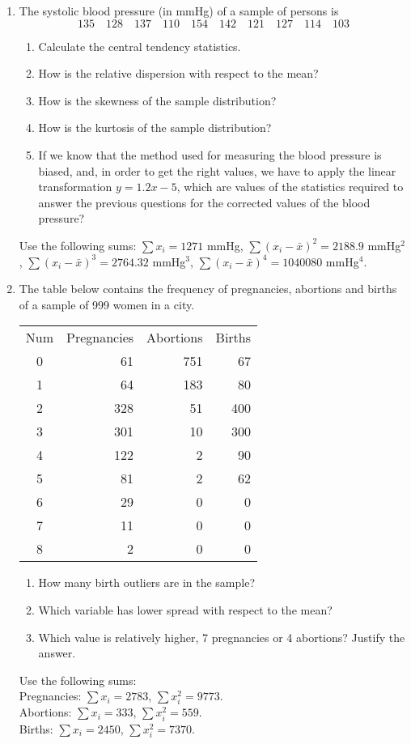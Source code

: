 \begin{enumerate}[leftmargin=*]
\item The systolic blood pressure (in mmHg) of a sample of persons is
\[
135\quad 128\quad 137\quad 110\quad 154\quad 142\quad 121\quad 127\quad 114\quad 103
\]

\begin{enumerate}
\item Calculate the central tendency statistics.
\item How is the relative dispersion with respect to the mean?
\item How is the skewness of the sample distribution?
\item How is the kurtosis of the sample distribution?
\item If we know that the method used for measuring the blood pressure is biased, and, in order to get the right values,
we have to apply the linear transformation $y=1.2x-5$, which are values of the statistics required to answer the
previous questions for the corrected values of the blood pressure?
\end{enumerate}


Use the following sums: $\sum x_i= 1271$ mmHg, $\sum (x_i-\bar x)^2=2188.9$ mmHg$^2$, $\sum (x_i-\bar x)^3=2764.32$
mmHg$^3$, $\sum (x_i-\bar x)^4=1040080$ mmHg$^4$.


\item The table below contains the frequency of pregnancies, abortions and
births of a sample of 999 women in a city.

\begin{center}
\begin{tabular}{crrr}
\toprule
Num & Pregnancies & Abortions & Births\\
0 & 61 & 751 & 67 \\
1 & 64 & 183 & 80 \\
2 & 328 & 51 & 400 \\
3 & 301 & 10 & 300 \\
4 & 122 & 2 & 90 \\
5 & 81 & 2 & 62 \\
6 & 29 & 0 & 0 \\
7 & 11 & 0 & 0 \\
8 & 2 & 0 & 0 \\
\bottomrule
\end{tabular}
\end{center}

\begin{enumerate}
\item How many birth outliers are in the sample?
\item Which variable has lower spread with respect to the mean?
\item Which value is relatively higher, 7 pregnancies or 4 abortions? Justify the answer.
\end{enumerate}

Use the following sums:\\
Pregnancies: $\sum x_i= 2783$, $\sum x_i^2=9773$.\\
Abortions: $\sum x_i= 333$, $\sum x_i^2=559$.\\
Births: $\sum x_i= 2450$, $\sum x_i^2=7370$.

\end{enumerate}
